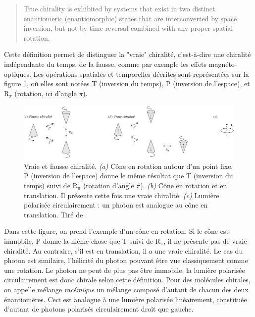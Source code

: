 \begin{quotation}
True chirality is exhibited by systems that exist in two distinct enantiomeric (enantiomorphic) states that are interconverted by space inversion, but not by time reversal combined with any proper spatial rotation.
\end{quotation}

Cette définition permet de distinguer la "vraie" chiralité, c'est-à-dire une chiralité indépendante du temps, de la fausse, comme par exemple les effets magnéto-optiques. Les opérations spatiales et temporelles décrites sont représentées sur la figure \ref{fig:truefalsechir}, où elles sont notées T (inversion du temps), P (inversion de l'espace), et $\text{R}_{\pi}$ (rotation, ici d'angle $\pi$). 

\begin{figure}[!ht]
\centering
\includegraphics[width=.9\columnwidth]{Figures/Chirality/truefalsechir.pdf}%
\caption{Vraie et fausse chiralité. \textit{(a)} Cône en rotation autour d'un point fixe. P (inversion de l'espace) donne le même résultat que T (inversion du temps) suivi de $\text{R}_{\pi}$ (rotation d'angle $\pi$). \textit{(b)} Cône en rotation et en translation. Il présente cette fois une vraie chiralité. \textit{(c)} Lumière polarisée circulairement : un photon est analogue au cône en translation. Tiré de .}
\label{fig:truefalsechir}
\end{figure}

Dans cette figure, on prend l'exemple d'un cône en rotation. Si le cône est immobile, P donne la même chose que T suivi de $\text{R}_{\pi}$, il ne présente pas de vraie chiralité. Au contraire, s'il est en translation, il a une vraie chiralité. Le cas du photon est similaire, l'hélicité du photon pouvant être vue classiquement comme une rotation. Le photon ne peut de plus pas être immobile, la lumière polarisée circulairement est donc chirale selon cette définition. Pour des molécules chirales, on appelle mélange \textit{racémique} un mélange composé d'autant de chacun des deux énantiomères. Ceci est analogue à une lumière polarisée linéairement, constituée d'autant de photons polarisés circulairement droit que gauche. 

